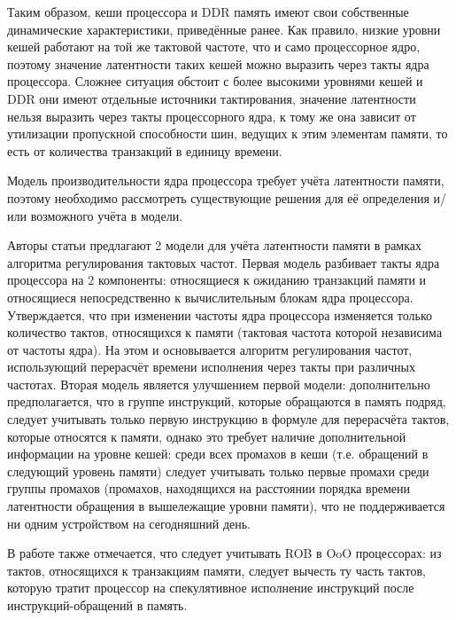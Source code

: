     Таким образом, кеши процессора и DDR память имеют свои собственные динамические характеристики,
    приведённые ранее. Как правило, низкие уровни кешей работают на той же тактовой частоте, что
    и само процессорное ядро, поэтому значение латентности таких кешей можно выразить через такты ядра
    процессора. Сложнее ситуация обстоит с более высокими уровнями кешей и DDR они имеют отдельные
    источники тактирования, значение латентности нельзя выразить через такты процессорного ядра,
    к тому же она зависит от утилизации пропускной способности шин, ведущих к этим элементам памяти,
    то есть от количества транзакций в единицу времени.

    Модель производительности ядра процессора требует учёта латентности памяти, поэтому
    необходимо рассмотреть существующие решения для её определения и/или возможного учёта в модели.

    Авторы статьи \cite{keramidas2010interval} предлагают 2 модели для учёта латентности памяти
    в рамках алгоритма регулирования тактовых частот. Первая модель разбивает такты ядра процессора
    на 2 компоненты: относящиеся к ожиданию транзакций памяти и относящиеся непосредственно к вычислительным
    блокам ядра процессора. Утверждается, что при изменении частоты ядра процессора изменяется только
    количество тактов, относящихся к памяти (тактовая частота которой независима от частоты ядра).
    На этом и основывается алгоритм регулирования частот, использующий перерасчёт времени
    исполнения через такты при различных частотах. Вторая модель является улучшением
    первой модели: дополнительно предполагается, что в группе инструкций, которые обращаются в
    память подряд, следует учитывать только первую инструкцию в формуле для перерасчёта тактов,
    которые относятся к памяти, однако это требует наличие дополнительной информации на уровне кешей:
    среди всех промахов в кеши (т.е. обращений в следующий уровень памяти) следует учитывать только
    первые промахи среди группы промахов (промахов, находящихся на расстоянии порядка времени
    латентности обращения в вышележащие уровни памяти), что не поддерживается ни одним устройством
    на сегодняшний день.

    В работе также отмечается, что следует учитывать ROB в OoO процессорах: из тактов, относящихся к
    транзакциям памяти, следует вычесть ту часть тактов, которую тратит процессор на спекулятивное
    исполнение инструкций после инструкций-обращений в память.

